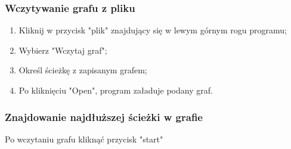 \documentclass[a4paper,12pt]{article}
\begin{document}
\subsubsection{Wczytywanie grafu z pliku}
\begin{enumerate}
\item Kliknij w przycisk "plik" znajdujący się w lewym górnym rogu programu;
\item Wybierz "Wczytaj graf";
\item Określ ścieżkę z zapisanym grafem;
\item Po kliknięciu "Open", program załaduje podany graf.
\end{enumerate}
\subsubsection{Znajdowanie najdłuższej ścieżki w grafie}
Po wczytaniu grafu kliknąć przycisk "start"
\end{document}
